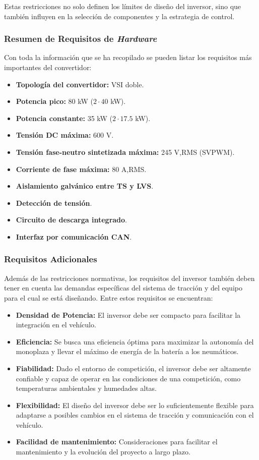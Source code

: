 Estas restricciones no solo definen los límites de diseño del inversor, sino que también influyen en la selección de componentes y la estrategia de control.

\subsubsection{Resumen de Requisitos de \textit{Hardware}}

Con toda la información que se ha recopilado se pueden listar los requisitos más importantes del convertidor:
\begin{itemize}
	\item \textbf{Topología del convertidor:} VSI doble.
	\item \textbf{Potencia pico:} 80 kW ($2\cdot40$ kW).
	\item \textbf{Potencia constante:} 35 kW ($2\cdot17.5$ kW).
	\item \textbf{Tensión DC máxima:} 600 V.
	\item \textbf{Tensión fase-neutro sintetizada máxima:} 245 V,RMS (SVPWM).
	\item \textbf{Corriente de fase máxima:} 80 A,RMS.
	\item \textbf{Aislamiento galvánico entre TS y LVS}.
	\item \textbf{Detección de tensión}.
	\item \textbf{Circuito de descarga integrado}.
	\item \textbf{Interfaz por comunicación CAN}.
	
	
\end{itemize}

\subsubsection{Requisitos Adicionales}
Además de las restricciones normativas, los requisitos del inversor también deben tener en cuenta las demandas específicas del sistema de tracción y del equipo para el cual se está diseñando. Entre estos requisitos se encuentran:

\begin{itemize}
	\item \textbf{Densidad de Potencia:} El inversor debe ser compacto para facilitar la integración en el vehículo.
	\item \textbf{Eficiencia:} Se busca una eficiencia óptima para maximizar la autonomía del monoplaza y llevar el máximo de energía de la batería a los neumáticos.
	\item \textbf{Fiabilidad:} Dado el entorno de competición, el inversor debe ser altamente confiable y capaz de operar en las condiciones de una competición, como temperaturas ambientales y humedades altas.
	\item \textbf{Flexibilidad:} El diseño del inversor debe ser lo suficientemente flexible para adaptarse a posibles cambios en el sistema de tracción y comunicación con el vehículo.
	\item \textbf{Facilidad de mantenimiento:} Consideraciones para facilitar el mantenimiento y la evolución del proyecto a largo plazo.
\end{itemize}

